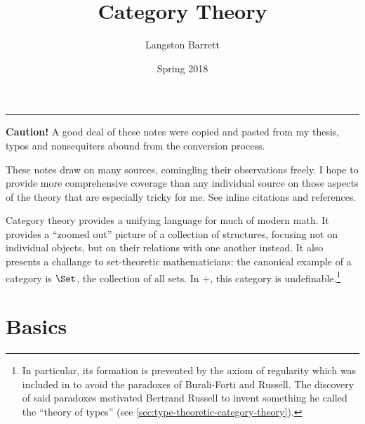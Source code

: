 \documentclass[a5paper]{article}
\begin{document}
\title{Category Theory}
\author{Langston Barrett}
\date{Spring 2018}
\maketitle
\tableofcontents
\vspace{1em}
\hrule
\vspace{1em}

\begin{remark*}
  \textbf{Caution!} A good deal of these notes were copied and pasted from my
  thesis, typos and nonsequiters abound from the conversion process.

  These notes draw on many sources, comingling their observations freely. I hope
  to provide more comprehensive coverage than any individual source on those
  aspects of the theory that are especially tricky for me. See inline citations
  and references.
\end{remark*}

Category theory provides a unifying language for much of modern math. It
provides a ``zoomed out'' picture of a collection of structures, focusing not on
individual objects, but on their relations with one another instead. 
It also presents a challange to set-theoretic mathematicians: the
canonical example of a category is $\Set$, the collection of all sets. In
\ZFC{}+\FOL{}, this category is undefinable.\footnote{In
  particular, its formation is prevented by the axiom of regularity
  which was included in \ZFC{} to avoid the
  paradoxes of Burali-Forti and Russell. The discovery of said paradoxes
  motivated Bertrand Russell to invent something he called the ``theory of
  types'' (see \cref{sec:type-theoretic-category-theory}).}

\section{Basics}
\label{sec:basics}
\end{document}

